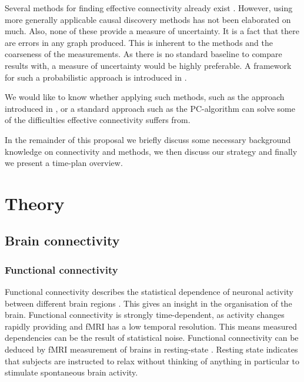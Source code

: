 \documentclass[a4paper, 10pt, english, twocolumn]{article}
\begin{document}
Several methods for finding effective connectivity already exist \cite{mclntosh1994, harrison2003, friston2003, roebroeck2005}.
However, using more generally applicable causal discovery methods has not been elaborated on much.
Also, none of these provide a measure of uncertainty.
It is a fact that there are errors in any graph produced.
This is inherent to the methods and the coarseness of the measurements.
As there is no standard baseline to compare results with, a measure of uncertainty would be highly preferable.
A framework for such a probabilistic approach is introduced in \cite{claassen2012}.

We would like to know whether applying such methods, such as the approach introduced in \cite{claassen2012}, or a standard approach such as the PC-algorithm \cite{spirtes2000} can solve some of the difficulties effective connectivity suffers from.

In the remainder of this proposal we briefly discuss some necessary background knowledge on connectivity and methods, we then discuss our strategy and finally we present a time-plan overview.

\section{Theory}

\subsection*{Brain connectivity}

\subsubsection*{Functional connectivity}
Functional connectivity describes the statistical dependence of neuronal activity between different brain regions \cite{friston1993functional}.
This gives an insight in the organisation of the brain.
Functional connectivity is strongly time-dependent, as activity changes rapidly providing and fMRI has a low temporal resolution.
This means measured dependencies can be the result of statistical noise.
Functional connectivity can be deduced by fMRI measurement of brains in resting-state \cite{Lowe2000, doria2010, Bullmore2009}.
Resting state indicates that subjects are instructed to relax without thinking of anything in particular to stimulate spontaneous brain activity.
\end{document}
